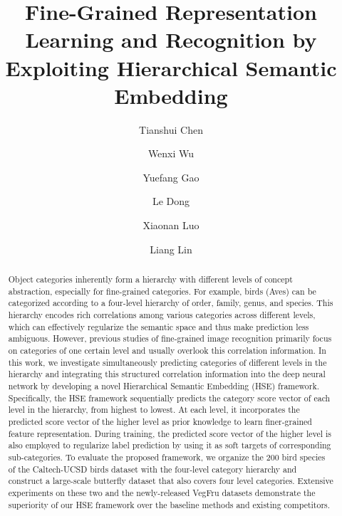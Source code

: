 \documentclass[sigconf]{acmart}
\begin{document}
\title{Fine-Grained Representation Learning and Recognition by \\ Exploiting Hierarchical Semantic Embedding}



\author{Tianshui Chen}

\author{Wenxi Wu}

\author{Yuefang Gao}

\author{Le Dong}

\author{Xiaonan Luo}

\author{Liang Lin}



\begin{abstract}
Object categories inherently form a hierarchy with different levels of concept abstraction, especially for fine-grained categories. For example, birds (Aves) can be categorized according to a four-level hierarchy of order, family, genus, and species. This hierarchy encodes rich correlations among various categories across different levels, which can effectively regularize the semantic space and thus make prediction less ambiguous. However, previous studies of fine-grained image recognition primarily focus on categories of one certain level and usually overlook this correlation information. In this work, we investigate simultaneously predicting categories of different levels in the hierarchy and integrating this structured correlation information into the deep neural network by developing a novel Hierarchical Semantic Embedding (HSE) framework. Specifically, the HSE framework sequentially predicts the category score vector of each level in the hierarchy, from highest to lowest. At each level, it incorporates the predicted score vector of the higher level as prior knowledge to learn finer-grained feature representation. During training, the predicted score vector of the higher level is also employed to regularize label prediction by using it as soft targets of corresponding sub-categories. To evaluate the proposed framework, we organize the 200 bird species of the Caltech-UCSD birds dataset with the four-level category hierarchy and construct a large-scale butterfly dataset that also covers four level categories. Extensive experiments on these two and the newly-released VegFru datasets demonstrate the superiority of our HSE framework over the baseline methods and existing competitors. 
\end{abstract}
\end{document}
